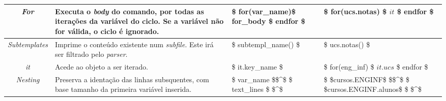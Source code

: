 \documentclass[../relatorio.tex]{subfiles}
\begin{document}
\begin{landscape}
\begin{table}[!ht]
\begin{tabular}{|c|p{7cm}|p{6cm}|p{7cm}|}
                \\
                \hline
                \textit{For}
                &
                Executa o \textit{body} do 
                comando, por todas as iterações 
                da variável do ciclo.
                Se a variável não for válida, o 
                ciclo é ignorado.
                &
                \$ for(var\_name)\$                     \newline
                    for\_body                           \newline
                \$ endfor \$                            \newline
                &
                \$ for(ucs.notas) \$                    \newline
                    $it$                                \newline
                \$ endfor \$                            \newline
                \\
                \hline
                \textit{Subtemplates}
                &
                Imprime o conteúdo existente 
                num \textit{subfile}.
                Este irá ser filtrado pelo 
                \textit{parser}.
                &
                \$ subtempl\_name() \$
                &
                \$ ucs.notas() \$
                \\
                \hline
                \textit{it}
                &
                Acede ao objeto a ser iterado.
                &
                \$ it.key\_name \$
                &
                \$ for(eng\_inf) \$                    \newline
                    $it.ucs$                           \newline
                \$ endfor \$                           \newline
                \\
                \hline 
                \textit{Nesting}
                &
                Preserva a identação das linhas
                subsquentes, com base tamanho
                da primeira variável inserida.
                &
                \$ var\_name \$\$\^{}\$ \$ text\_lines \$ \$\^{}\$
                &
                \$ \$cursos.ENGINF\$ \$\$\^{}\$         \newline
                \$ \$cursos.ENGINF.alunos\$ \$ \$\^{}\$ \newline
                \\

\end{tabular}
\end{table}
\end{landscape}
\end{document}
